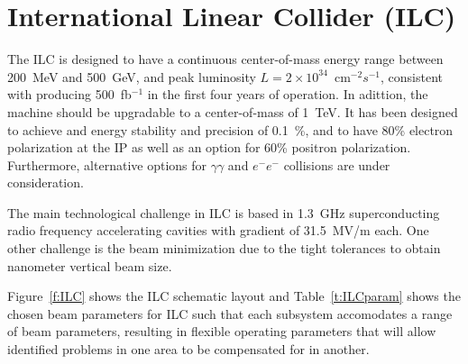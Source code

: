 \section{International Linear Collider (ILC)}
The ILC \cite{ILCdes} is designed to have a continuous center-of-mass energy range between 200~MeV and 500~GeV, and peak luminosity $L=2\times10^34$~cm$^{-2}s^{-1}$, consistent with producing 500~fb$^{-1}$ in the first four years of operation. In adittion, the machine should be upgradable to a center-of-mass of 1~TeV. It has been designed to achieve and energy stability and precision of 0.1~\%, and to have 80\% electron polarization at the IP as well as an option for 60\% positron polarization. Furthermore, alternative options for $\gamma\gamma$ and $e^-e^-$ collisions are under consideration.\par
The main technological challenge in ILC is based in 1.3~GHz superconducting radio frequency accelerating cavities with gradient of 31.5~MV/m each. One other challenge is the beam minimization due to the tight tolerances to obtain nanometer vertical beam size.\par
Figure~\ref{f:ILC} shows the ILC schematic layout and Table~\ref{t:ILCparam} shows the chosen beam parameters for ILC such that each subsystem accomodates a range of beam parameters, resulting in flexible operating parameters that will allow identified problems in one area to be compensated for in another.\par
